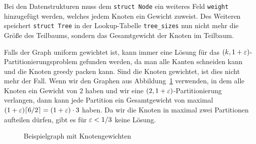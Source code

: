 Bei den Datenstrukturen muss dem \texttt{struct Node} ein weiteres Feld \texttt{weight} hinzugefügt werden, welches jedem Knoten ein Gewicht zuweist.
Des Weiteren speichert \texttt{struct Tree} in der Lookup-Tabelle \texttt{tree\_sizes} nun nicht mehr die Größe des Teilbaums, sondern das Gesamtgewicht der Knoten im Teilbaum.

\begin{rem}
    Falls der Graph uniform gewichtet ist, kann immer eine Lösung für das $(k,1+\varepsilon)$\hyp Partitionierungsproblem gefunden werden, da man alle Kanten schneiden kann und die Knoten greedy packen kann.
    Sind die Knoten gewichtet, ist dies nicht mehr der Fall.
    Wenn wir den Graphen aus Abbildung~\ref{fig:graph} verwenden, in dem alle Knoten ein Gewicht von $2$ haben und wir eine $(2, 1 + \varepsilon)$\hyp Partitionierung verlangen, dann kann jede Partition ein Gesamtgewicht von maximal $(1 + \varepsilon) \lceil6/2\rceil = (1 + \varepsilon) \cdot 3$ haben.
    Da wir die Knoten in maximal zwei Partitionen aufteilen dürfen, gibt es für $\varepsilon < 1/3$ keine Lösung.
\end{rem}

\begin{figure}
    \centering
    \caption{Beispielgraph mit Knotengewichten\label{fig:graph}}
\end{figure}
